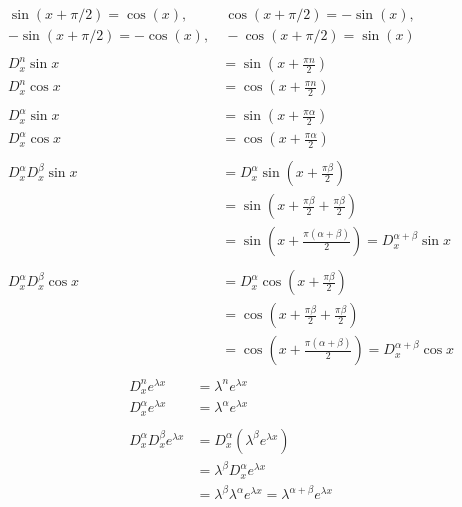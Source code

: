 \documentclass[a4paper,11pt]{article}
\theoremstyle{plain}
\theoremstyle{definition}
\begin{document}
\begin{align*}
	\sin(x+\pi/2) = \cos(x),&\ \cos(x+\pi/2) = -\sin (x),\\
	-\sin(x+\pi/2) = -\cos(x),&\ -\cos(x+\pi/2) = \sin(x) \\
	\\
	D_x^n \sin x &= \sin \left(x+\frac{\pi n}{2}\right) \\
	D_x^n \cos x &= \cos \left(x+\frac{\pi n}{2}\right) \\
	\\
	D_x^\alpha \sin x &= \sin \left(x+\frac{\pi \alpha}{2}\right) \\
	D_x^\alpha \cos x &= \cos \left(x+\frac{\pi \alpha}{2}\right) \\
	\\
	D_x^\alpha D_x^\beta \sin x 
	&= 	D_x^\alpha \sin \left(x+\frac{\pi \beta}{2}\right) \\
	&= 	\sin \left(x+\frac{\pi \beta}{2}+\frac{\pi \beta}{2}\right) \\
	&= 	\sin \left(x+\frac{\pi (\alpha+\beta)}{2}\right) 
	= D_x^{\alpha+\beta} \sin x\\
	\\
	D_x^\alpha D_x^\beta \cos x 
	&= 	D_x^\alpha \cos \left(x+\frac{\pi \beta}{2}\right) \\
	&= 	\cos \left(x+\frac{\pi \beta}{2}+\frac{\pi \beta}{2}\right) \\
	&= 	\cos \left(x+\frac{\pi (\alpha+\beta)}{2}\right) 
	= D_x^{\alpha+\beta} \cos x\\
\end{align*}
\begin{align*}
	D_x^n e^{\lambda x} &= \lambda^n e^{\lambda x} \\
	D_x^\alpha e^{\lambda x} &= \lambda^\alpha e^{\lambda x} \\
	\\
	D_x^\alpha D_x^\beta e^{\lambda x} &= D_x^\alpha\left( \lambda^\beta
	e^{\lambda x}\right) \\
	&= \lambda^\beta D_x^\alpha e^{\lambda x} \\
	&= \lambda^\beta \lambda^\alpha e^{\lambda x} 
	= \lambda^{\alpha+\beta} e^{\lambda x}\\
\end{align*}
\newpage
\end{document}
